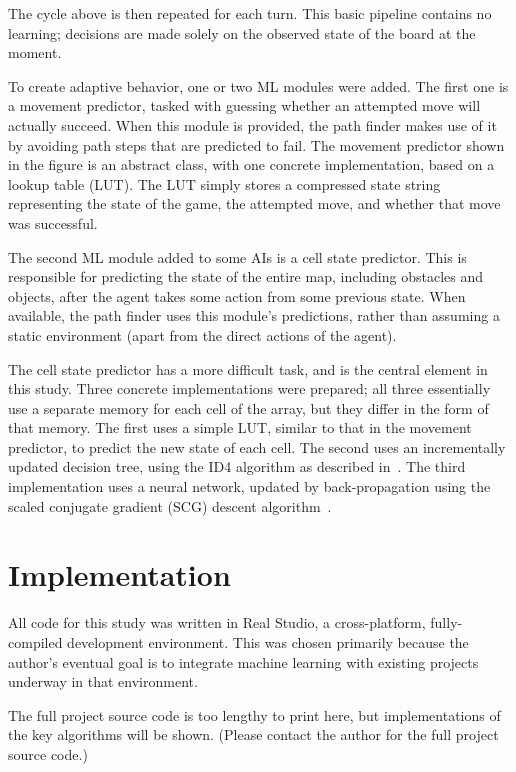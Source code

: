 \documentclass{article}
\begin{document}
The cycle above is then repeated for each turn.  This basic pipeline contains no learning; decisions are made solely on the observed state of the board at the moment.

To create adaptive behavior, one or two ML modules were added.  The first one is a movement predictor, tasked with guessing whether an attempted move will actually succeed.  When this module is provided, the path finder makes use of it by avoiding path steps that are predicted to fail.  The movement predictor shown in the figure is an abstract class, with one concrete implementation, based on a lookup table (LUT).  The LUT simply stores a compressed state string representing the state of the game, the attempted move, and whether that move was successful.

The second ML module added to some AIs is a cell state predictor.  This is responsible for predicting the state of the entire map, including obstacles and objects, after the agent takes some action from some previous state.  When available, the path finder uses this module's predictions, rather than assuming a static environment (apart from the direct actions of the agent).

The cell state predictor has a more difficult task, and is the central element in this study.  Three concrete implementations were prepared; all three essentially use a separate memory for each cell of the array, but they differ in the form of that memory.  The first uses a simple LUT, similar to that in the movement predictor, to predict the new state of each cell.  The second uses an incrementally updated decision tree, using the ID4 algorithm as described in~\cite{AIFORGAMES}.  The third implementation uses a neural network, updated by back-propagation using the scaled conjugate gradient (SCG) descent algorithm~\cite{CHUCKSCG}.

\section{Implementation}

All code for this study was written in Real Studio, a cross-platform, fully-compiled development environment.  This was chosen primarily because the author's eventual goal is to integrate machine learning with existing projects underway in that environment.

The full project source code is too lengthy to print here, but implementations of the key algorithms will be shown.  (Please contact the author for the full project source code.)
\end{document}
